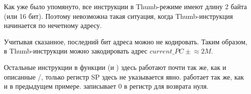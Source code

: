 Как уже было упомянуто, все инструкции в Thumb-режиме имеют длину 2 байта (или 16 бит).
Поэтому невозможна такая ситуация, когда Thumb-инструкция начинается по нечетному адресу.

Учитывая сказанное, последний бит адреса можно не кодировать.
Таким образом, в Thumb-инструкции  можно закодировать адрес $current\_PC \pm{}\approx{}2M$.

Остальные инструкции в функции (\PUSH и \POP) здесь работают почти так же, как и описанные /, только регистр \ac{SP} здесь не указывается явно.
 работает так же, как и в предыдущем примере.
 записывает 0 в регистр  для возврата нуля.

